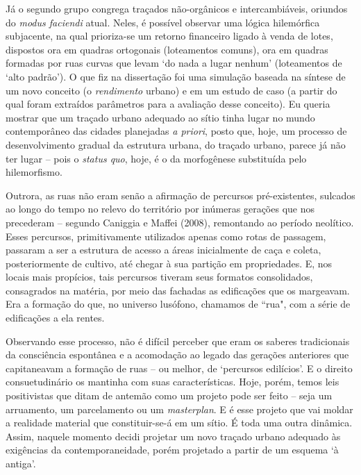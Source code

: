 \documentclass[]{report}
\begin{document}
	Já o segundo grupo congrega traçados não-orgânicos e intercambiáveis, oriundos do \textit{modus faciendi} atual. Neles, é possível observar uma lógica hilemórfica subjacente, na qual prioriza-se um retorno financeiro ligado à venda de lotes, dispostos ora em quadras ortogonais (loteamentos comuns), ora em quadras formadas por ruas curvas que levam `do nada a lugar nenhum' (loteamentos de `alto padrão').%
	O que fiz na dissertação foi uma simulação baseada na síntese de um novo conceito (o \textit{rendimento} urbano) e em um estudo de caso (a partir do qual foram extraídos parâmetros para a avaliação desse conceito). Eu queria mostrar que um traçado urbano adequado ao sítio tinha lugar no mundo contemporâneo das cidades planejadas \textit{a priori}, posto que, hoje, um processo de desenvolvimento gradual da estrutura urbana, do traçado urbano, parece já não ter lugar – pois o \textit{status quo}, hoje, é o da morfogênese substituída pelo hilemorfismo. 
	
	Outrora, as ruas não eram senão a afirmação de percursos pré-existentes, sulcados ao longo do tempo no relevo do território por inúmeras gerações que nos precederam – segundo Caniggia e Maffei (2008), remontando ao período neolítico. Esses percursos, primitivamente utilizados apenas como rotas de passagem, passaram a ser a estrutura de acesso a áreas inicialmente de caça e coleta, posteriormente de cultivo, até chegar à sua partição em propriedades. E, nos locais mais propícios, tais percursos tiveram seus formatos consolidados, consagrados na matéria, por meio das fachadas as edificações que os margeavam. Era a formação do que, no universo lusófono, chamamos de ``rua", com a série de edificações a ela rentes.
	
	Observando esse processo, não é difícil perceber que eram os saberes tradicionais da consciência espontânea e a acomodação ao legado das gerações anteriores que capitaneavam a formação de ruas – ou melhor, de `percursos edilícios'. E o direito consuetudinário os mantinha com suas características. Hoje, porém, temos leis positivistas que ditam de antemão como um projeto pode ser feito – seja um arruamento, um parcelamento ou um \textit{masterplan}. E é esse projeto que vai moldar a realidade material que constituir-se-á em um sítio. É toda uma outra dinâmica. Assim, naquele momento decidi projetar um novo traçado urbano adequado às exigências da contemporaneidade, porém projetado a partir de um esquema `à antiga'.
\end{document}
